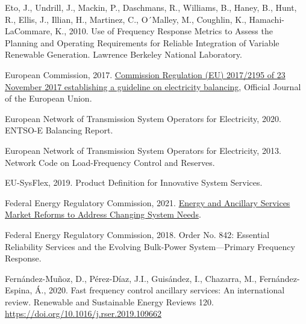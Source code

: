 \documentclass[12pt,a4paper,]{report}
\newlength{\cslhangindent}
\newenvironment{CSLReferences}[2] %
 {%
  \setlength{\parindent}{0pt}
  \ifodd #1 \everypar{\setlength{\hangindent}{\cslhangindent}}\ignorespaces\fi
  \ifnum #2 > 0
  \setlength{\parskip}{#2\baselineskip}
  \fi
 }%
 {}
\begin{document}
\begin{CSLReferences}{1}{0}
\leavevmode{}%
Eto, J., Undrill, J., Mackin, P., Daschmans, R., Williams, B., Haney,
B., Hunt, R., Ellis, J., Illian, H., Martinez, C., O´Malley, M.,
Coughlin, K., Hamachi-LaCommare, K., 2010. Use of {Frequency Response
Metrics} to {Assess} the {Planning} and {Operating Requirements} for
{Reliable Integration} of {Variable Renewable Generation}. {Lawrence
Berkeley National Laboratory}.

\leavevmode{}%
European Commission, 2017.
\href{https://eur-lex.europa.eu/legal-content/EN/TXT/?uri=uriserv:OJ.L_.2017.312.01.0006.01.ENG&toc=OJ:L:2017:312:TOC\#d1e4442-6-1}{Commission
{Regulation} ({EU}) 2017/2195 of 23 {November} 2017 establishing a
guideline on electricity balancing}, Official Journal of the European
Union.

\leavevmode{}%
European Network of Transmission System Operators for Electricity, 2020.
{ENTSO-E Balancing Report}.

\leavevmode{}%
European Network of Transmission System Operators for Electricity, 2013.
Network {Code} on {Load-Frequency Control} and {Reserves}.

\leavevmode{}%
EU-SysFlex, 2019. Product {Definition} for {Innovative System Services}.

\leavevmode{}%
Federal Energy Regulatory Commission, 2021.
\href{https://www.ferc.gov/news-events/news/ferc-staff-issues-report-energy-and-ancillary-services-market-reforms-address}{Energy
and {Ancillary Services Market Reforms} to {Address Changing System
Needs}}.

\leavevmode{}%
Federal Energy Regulatory Commission, 2018. Order {No}. 842: {Essential
Reliability Services} and the {Evolving Bulk-Power System}---{Primary
Frequency Response}.

\leavevmode{}%
Fernández-Muñoz, D., Pérez-Díaz, J.I., Guisández, I., Chazarra, M.,
Fernández-Espina, Á., 2020. Fast frequency control ancillary services:
{An} international review. Renewable and Sustainable Energy Reviews 120.
\url{https://doi.org/10.1016/j.rser.2019.109662}


\end{CSLReferences}
\end{document}
